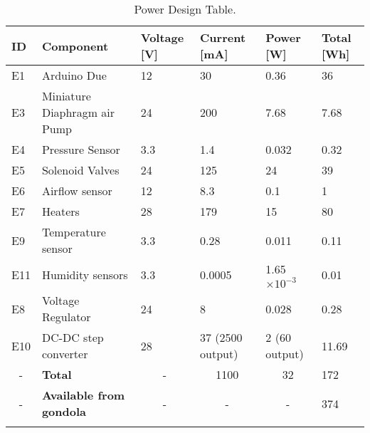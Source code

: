 

\begin{longtable}{|m{}| m{} |m{} |m{}|m{}| m{} |}
\hline
\textbf{ID}             & \textbf{Component}                                                   & \textbf{Voltage {[}V{]}} & \textbf{Current {[}mA{]}} & \textbf{Power {[}W{]}} & \textbf{Total {[}Wh{]}} \\ \hline
E1 & Arduino Due & 12& 30  & 0.36  & 36  \\ \hline
E3 & Miniature Diaphragm air Pump & 24 & 200 & 7.68 & 7.68 \\ \hline
E4  & Pressure Sensor  & 3.3 & 1.4 & 0.032 & 0.32  \\ \hline
E5  & Solenoid Valves & 24 & 125 & 24  & 39 \\ \hline
E6 & Airflow sensor & 12  & 8.3   & 0.1 & 1 \\ \hline

E7   &  Heaters & 28 & 179  & 15 & 80 \\ \hline
E9  & Temperature sensor & 3.3 & 0.28 & 0.011  & 0.11   \\ \hline

E11 & Humidity sensors & 3.3  & 0.0005   & 1.65$\times10^{-3}$  & 0.01 \\
\hline
E8  & Voltage Regulator   & 24   & 8 & 0.028 & 0.28 \\ \hline


E10  & DC-DC step converter   & 28   & 37 (2500 output) & 2 (60 output) & 11.69 \\ \hline
\multicolumn{1}{|c|}{-} & \textbf{Total}                                  & \multicolumn{1}{c|}{-}                      & \multicolumn{1}{c|}{1100}                    & \multicolumn{1}{c|}{32}                 & 172                                        \\ \hline
\multicolumn{1}{|c|}{-} & \textbf{Available from gondola}                 & \multicolumn{1}{c|}{-}                      & \multicolumn{1}{c|}{-}                       & \multicolumn{1}{c|}{-}                    & 374                                        \\ \hline

\caption{Power Design Table.}
\label{tab:power-design-table}
\end{longtable}
\raggedbottom

